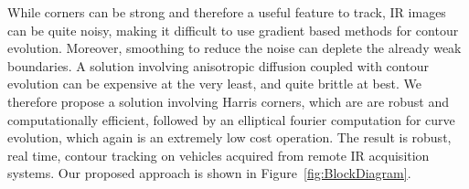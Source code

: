 \documentclass{article}
\begin{document}
While corners can be strong and therefore a useful feature to track, IR images can be quite noisy, making it difficult to use gradient based methods for contour evolution.  Moreover, smoothing to reduce the noise can deplete the already weak boundaries.  A solution involving anisotropic diffusion coupled with contour evolution can be expensive at the very least, and quite brittle at best.  We therefore propose a solution involving Harris corners, which are are robust and computationally efficient, followed by an elliptical fourier computation for curve evolution, which again is an extremely low cost operation.  The result is robust, real time, contour tracking on vehicles acquired from remote IR acquisition systems.  Our proposed approach is shown in Figure~\ref{fig:BlockDiagram}.  %
\end{document}
